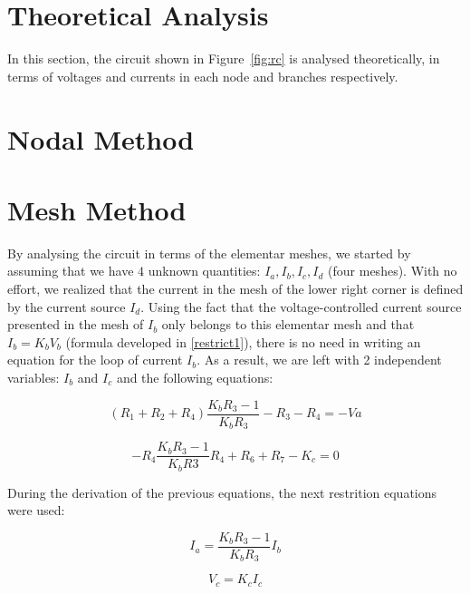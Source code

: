 \section{Theoretical Analysis}
\label{sec:analysis}

In this section, the circuit shown in Figure~\ref{fig:rc} is analysed
theoretically, in terms of voltages and currents in each node and branches respectively.


\section{Nodal Method}






\section{Mesh Method}

By analysing the circuit in terms of the elementar meshes, we started by assuming that we have $4$ unknown quantities: $I_a, I_b, I_c, I_d$ (four meshes).
With no effort, we realized that the current in the mesh of the lower right corner is defined by the current source $I_d$.
Using the fact that the voltage-controlled current source presented in the mesh of $I_b$ only belongs to this elementar mesh and that $I_b = K_b V_b$ (formula developed in \ref{restrict1}), there is no need in writing an equation for the loop of current $I_b$.
As a result, we are left with 2 independent variables: $I_b$ and $I_c$ and the following equations:


\begin{equation}
  (R_1 + R_2 + R_4) \frac{K_b R_3 -1}{K_b R_3}  - R_3  - R_4 = -Va
  \label{mesh1}
\end{equation}

\begin{equation}
  -R_4 \frac{K_b R_3 - 1}{K_b R3} R_4 + R_6 + R_7 - K_c = 0
  \label{mesh2}
\end{equation}

During the derivation of the previous equations, the next restrition equations were used:

\begin{equation}
  I_a = \frac{K_b R_3 -1}{K_b R_3} I_b
  \label{restrict1}
\end{equation}

\begin{equation}
  V_c = K_c I_c
\end{equation}

